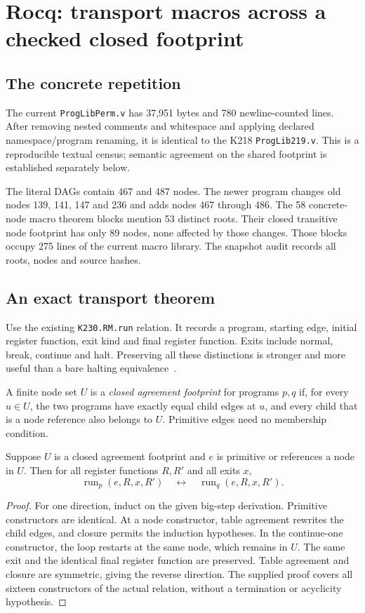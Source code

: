 \section{Rocq: transport macros across a checked closed footprint}
\subsection{The concrete repetition}
The current \texttt{ProgLibPerm.v} has 37,951 bytes and 780 newline-counted lines. After removing nested comments and whitespace and applying declared namespace/program renaming, it is identical to the K218 \texttt{ProgLib219.v}. This is a reproducible textual census; semantic agreement on the shared footprint is established separately below.

The literal DAGs contain 467 and 487 nodes. The newer program changes old nodes 139, 141, 147 and 236 and adds nodes 467 through 486. The 58 concrete-node macro theorem blocks mention 53 distinct roots. Their closed transitive node footprint has only 89 nodes, none affected by those changes. Those blocks occupy 275 lines of the current macro library. The snapshot audit records all roots, nodes and source hashes.

\subsection{An exact transport theorem}
Use the existing \texttt{K230.RM.run} relation. It records a program, starting edge, initial register function, exit kind and final register function. Exits include normal, break, continue and halt. Preserving all these distinctions is stronger and more useful than a bare halting equivalence~\cite{rocqmacro}.

\begin{definition}
A finite node set $U$ is a \emph{closed agreement footprint} for programs $p,q$ if, for every $u\in U$, the two programs have exactly equal child edges at $u$, and every child that is a node reference also belongs to $U$. Primitive edges need no membership condition.
\end{definition}

\begin{theorem}\label{thm:transport}
Suppose $U$ is a closed agreement footprint and $e$ is primitive or references a node in $U$. Then for all register functions $R,R'$ and all exits $x$,
\[
 \operatorname{run}_p(e,R,x,R')
 \quad\longleftrightarrow\quad
 \operatorname{run}_q(e,R,x,R').
\]
\end{theorem}
\begin{proof}
For one direction, induct on the given big-step derivation. Primitive constructors are identical. At a node constructor, table agreement rewrites the child edges, and closure permits the induction hypotheses. In the continue-one constructor, the loop restarts at the same node, which remains in $U$. The same exit and the identical final register function are preserved. Table agreement and closure are symmetric, giving the reverse direction. The supplied proof covers all sixteen constructors of the actual relation, without a termination or acyclicity hypothesis.
\end{proof}

